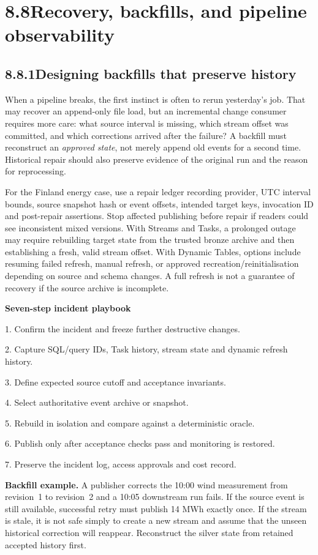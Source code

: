 \documentclass[11pt,twoside]{article}
\newcommand{\topic}[2]{\subsection*{#1\quad #2}}
\begin{document}
\section*{8.8\quad Recovery, backfills, and pipeline observability}
\topic{8.8.1}{Designing backfills that preserve history}
When a pipeline breaks, the first instinct is often to rerun yesterday's job. That may recover an append-only file load, but an incremental change consumer requires more care: what source interval is missing, which stream offset was committed, and which corrections arrived after the failure? A backfill must reconstruct an \emph{approved state}, not merely append old events for a second time. Historical repair should also preserve evidence of the original run and the reason for reprocessing.

For the Finland energy case, use a repair ledger recording provider, UTC interval bounds, source snapshot hash or event offsets, intended target keys, invocation ID and post-repair assertions. Stop affected publishing before repair if readers could see inconsistent mixed versions. With Streams and Tasks, a prolonged outage may require rebuilding target state from the trusted bronze archive and then establishing a fresh, valid stream offset. With Dynamic Tables, options include resuming failed refresh, manual refresh, or approved recreation/reinitialisation depending on source and schema changes. A full refresh is not a guarantee of recovery if the source archive is incomplete.
\begin{whitebox}\textbf{Seven-step incident playbook}\par
1. Confirm the incident and freeze further destructive changes.\par
2. Capture SQL/query IDs, Task history, stream state and dynamic refresh history.\par
3. Define expected source cutoff and acceptance invariants.\par
4. Select authoritative event archive or snapshot.\par
5. Rebuild in isolation and compare against a deterministic oracle.\par
6. Publish only after acceptance checks pass and monitoring is restored.\par
7. Preserve the incident log, access approvals and cost record.\end{whitebox}
\textbf{Backfill example.} A publisher corrects the 10:00 wind measurement from revision~1 to revision~2 and a 10:05 downstream run fails. If the source event is still available, successful retry must publish 14 MWh exactly once. If the stream is stale, it is not safe simply to create a new stream and assume that the unseen historical correction will reappear. Reconstruct the silver state from retained accepted history first.
\end{document}

